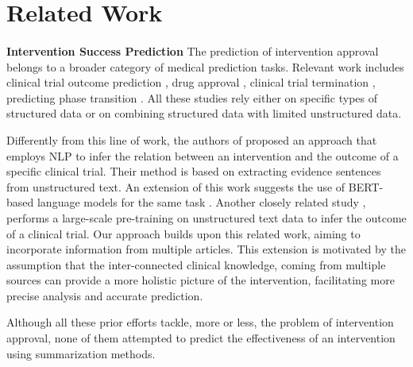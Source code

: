 \documentclass[11pt]{article}
\begin{document}
\section{Related Work}

\paragraph{} 
\textbf{Intervention Success Prediction} The prediction of intervention approval belongs to a broader category of medical prediction tasks. Relevant work includes clinical trial outcome prediction \cite{munos2020improving, tong2019machine, hong2020predicting},  drug approval \cite{gayvert2016data,lo2018machine, siah2021predicting, heinemann2016reflection}, clinical trial termination \cite{follett2019quantifying, geletta2019latent, elkin2021predictive}, predicting phase transition \cite{hegge2020predicting, qi2019predicting}. All these studies rely either on specific types of structured data or on combining structured data with limited unstructured data.

Differently from this line of work, the authors of \cite{lehman2019inferring} proposed an approach that employs NLP to infer the relation between an intervention and the outcome of a specific clinical trial. Their method is based on extracting evidence sentences from unstructured text. An extension of this work suggests the use of BERT-based language models for the same task \cite{deyoung2020evidence}. Another closely related study \cite{jin2020predicting}, performs a large-scale pre-training on unstructured text data to infer the outcome of a clinical trial. Our approach builds upon this related work, aiming to incorporate information from multiple articles. This extension is motivated by the assumption that the inter-connected clinical knowledge, coming from multiple sources can provide a more holistic picture of the intervention, facilitating more precise analysis and accurate prediction.   

Although all these prior efforts tackle, more or less, the problem of intervention approval, none of them attempted to predict the effectiveness of an intervention using summarization methods.  
\end{document}
